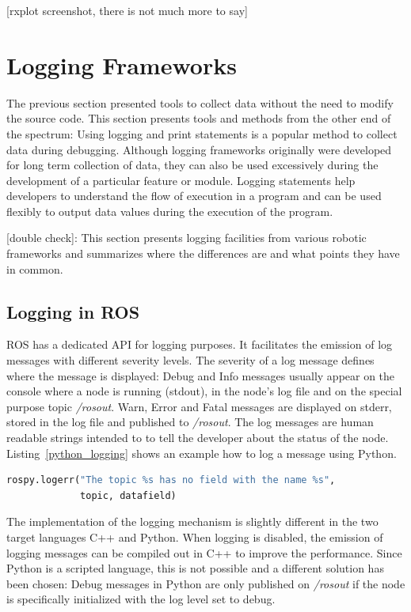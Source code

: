 [rxplot screenshot, there is not much more to say]


\section{Logging Frameworks}

The previous section presented tools to collect data without the need to modify the source code. This section presents tools and methods from the other end of the spectrum: Using logging and print statements is a popular method to collect data during debugging. Although logging frameworks originally were developed for long term collection of data, they can also be used excessively during the development of a particular feature or module. Logging statements help developers to understand the flow of execution in a program and can be used flexibly to output data values during the execution of the program.

[double check]: 
This section presents logging facilities from various robotic frameworks and summarizes where the differences are and what points they have in common.


\subsection{Logging in ROS}
\label{ros_logging}

ROS has a dedicated API for logging purposes. It facilitates the emission of log messages with different severity levels. The severity of a log message defines where the message is displayed: Debug and Info messages usually appear on the console where a node is running (stdout), in the node's log file and on the special purpose topic \emph{/rosout}. Warn, Error and Fatal messages are displayed on stderr, stored in the log file and published to \emph{/rosout}. The log messages are human readable strings intended to to tell the developer about the status of the node. Listing~\ref{python_logging} shows an example how to log a message using Python.

\begin{lstlisting}[frame=single,caption={ROS logging example in Python.},label=python_logging,language=Python]
rospy.logerr("The topic %s has no field with the name %s",
             topic, datafield)
\end{lstlisting}

The implementation of the logging mechanism is slightly different in the two target languages C++ and Python. When logging is disabled, the emission of logging messages can be compiled out in C++ to improve the performance. Since Python is a scripted language, this is not possible and a different solution has been chosen: Debug messages in Python are only published on \emph{/rosout} if the node is specifically initialized with the log level set to debug.

